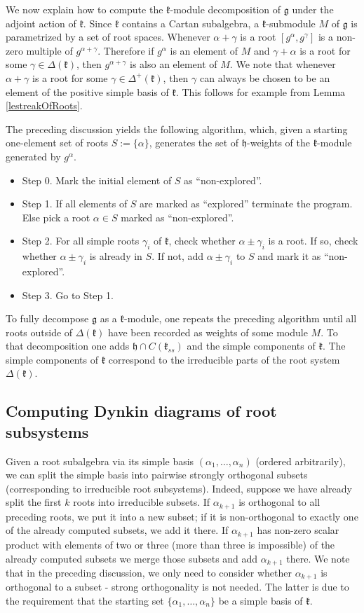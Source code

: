 \documentclass[12pt]{report}
\newcommand{\kk}{\mathfrak{k}}
\newcommand{\hh}{\mathfrak{h}}
\newcommand{\gG}{\mathfrak{g}}
\begin{document}
We now explain how to compute the $\kk$-module decomposition of $\gG$ under the adjoint action of $\kk$. Since $\kk$ contains a Cartan subalgebra, a $\kk$-submodule $M$ of $\gG$ is parametrized by a set of root spaces. Whenever $\alpha+\gamma$ is a root $[g^{\alpha},g^{\gamma}]$ is a non-zero multiple of $g^{\alpha+\gamma}$. Therefore if $g^{\alpha}$ is an element of $M$ and $\gamma+\alpha$ is a root for some $\gamma\in\Delta(\kk)$, then $g ^{\alpha+\gamma}$ is also an element of $M$. We note that whenever $\alpha+\gamma$ is a root for some $\gamma\in\Delta^+(\kk)$, then $\gamma$ can always be chosen to be an element of the positive simple basis of $\kk$. This follows for example from Lemma \ref{lestreakOfRoots}. 

The preceding discussion yields the following algorithm, which, given a starting one-element set of roots $S:=\{\alpha\}$, generates the set of $\hh$-weights of the $\kk$-module generated by $g^\alpha$.
\begin{itemize}
\item Step 0. Mark the initial element of $S$ as ``non-explored''.
\item Step 1. If all elements of $S$ are marked as ``explored'' terminate the program. Else pick a root $\alpha\in S$ marked as ``non-explored''.
\item Step 2. For all simple roots $\gamma_i$ of $\kk$, check whether $\alpha\pm\gamma_i$ is a root. If so, check whether $\alpha\pm \gamma_i$ is already in $S$. If not, add $\alpha\pm \gamma_i$ to $S$ and mark it as ``non-explored''.
\item Step 3. Go to Step 1.
\end{itemize}
To fully decompose $\gG$ as a $\kk$-module, one repeats the preceding algorithm until all roots outside of $\Delta(\kk)$ have been recorded as weights of some module $M$. To that decomposition one adds $\hh\cap C(\kk_{ss})$ and the simple components of $\kk$. The simple components of $\kk$ correspond to the irreducible parts of the root system $\Delta(\kk)$. 
\subsection{Computing Dynkin diagrams of root subsystems}
Given a root subalgebra via its simple basis $(\alpha_1,\dots,\alpha_n)$ (ordered arbitrarily), we can split the simple basis into pairwise strongly orthogonal subsets (corresponding to irreducible root subsystems). Indeed, suppose we have already split the first $k$ roots into irreducible subsets. If $\alpha_{k+1}$ is orthogonal to all preceding roots, we put it into a new subset; if it is non-orthogonal to exactly one of the already computed subsets, we add it there. If $\alpha_{k+1}$ has non-zero scalar product with elements of two or three (more than three is impossible) of the already computed subsets we merge those subsets and add $\alpha_{k+1}$ there. We note that in the preceding discussion, we only need to consider whether $\alpha_{k+1}$ is orthogonal to a subset - strong orthogonality is not needed. The latter is due to the requirement that the starting set $\{\alpha_1,\dots,\alpha_n\}$ be a simple basis of $\kk$.
\end{document}
